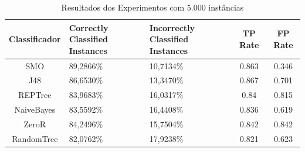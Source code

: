 \documentclass[
	12pt,				%
	openright,			%
	oneside,	
	a4paper,				%
	english,				%
	brazil				%
]{abntex2/abntex2} %
\begin{document}
		\begin{table}[htbp]
			\centering
			\caption{Resultados dos Experimentos com 5.000 instâncias}
			\label{tabResultadosExperimentos5k}
			\begin{center}
	\renewcommand{\arraystretch}{2}
	\begin{tabular}{cp{3cm}p{3.2cm}cc}
		\hline
		\textbf{Classificador}                & \textbf{Correctly Classified Instances}               & \textbf{Incorrectly Classified Instances}      	& \textbf{TP Rate}						&\textbf{FP Rate}   \\ \hline
		SMO                                      & 89,2866\%                                                                                 & 10,7134\% 							&0.863									&0.346                                                                                    \\
		J48                                      & 86,6530\%                                                                                  & 13,3470\% 							&0.867										&0.701                                                                                     \\
		REPTree                                  & 83,9683\%                                                                                 & 16,0317\%								&0.84											&0.815                                                                                     \\
		NaiveBayes                               & 83,5592\%                                                                                 & 16,4408\%								&0.836												&0.619                                                                                     \\ \hline \hline
		ZeroR    									& 84,2496\%                                                 									& 15,7504\%								&0.842											&0.842                                                     								\\
		RandomTree                               & 82,0762\%                                                                                 & 17,9238\%									&0.821												&0.623                                                                                     \\ \hline
	\end{tabular}
\end{center}
\end{table}
		
\end{document}
